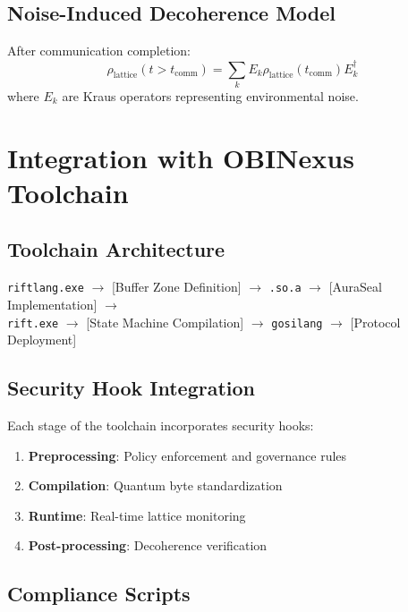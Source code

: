 \documentclass[12pt,a4paper]{article}
\begin{document}
\subsection{Noise-Induced Decoherence Model}

After communication completion:
\begin{equation}
\rho_{\text{lattice}}(t > t_{\text{comm}}) = \sum_k E_k \rho_{\text{lattice}}(t_{\text{comm}}) E_k^\dagger
\end{equation}
where $E_k$ are Kraus operators representing environmental noise.

\section{Integration with OBINexus Toolchain}

\subsection{Toolchain Architecture}

\begin{tcolorbox}[colback=gray!10!white,colframe=gray!80!black,title=OBINexus Toolchain Flow]
\texttt{riftlang.exe} $\rightarrow$ [Buffer Zone Definition] $\rightarrow$ \texttt{.so.a} $\rightarrow$ [AuraSeal Implementation] $\rightarrow$\\
\texttt{rift.exe} $\rightarrow$ [State Machine Compilation] $\rightarrow$ \texttt{gosilang} $\rightarrow$ [Protocol Deployment]
\end{tcolorbox}

\subsection{Security Hook Integration}

Each stage of the toolchain incorporates security hooks:
\begin{enumerate}
    \item \textbf{Preprocessing}: Policy enforcement and governance rules
    \item \textbf{Compilation}: Quantum byte standardization
    \item \textbf{Runtime}: Real-time lattice monitoring
    \item \textbf{Post-processing}: Decoherence verification
\end{enumerate}

\subsection{Compliance Scripts}
\end{document}

